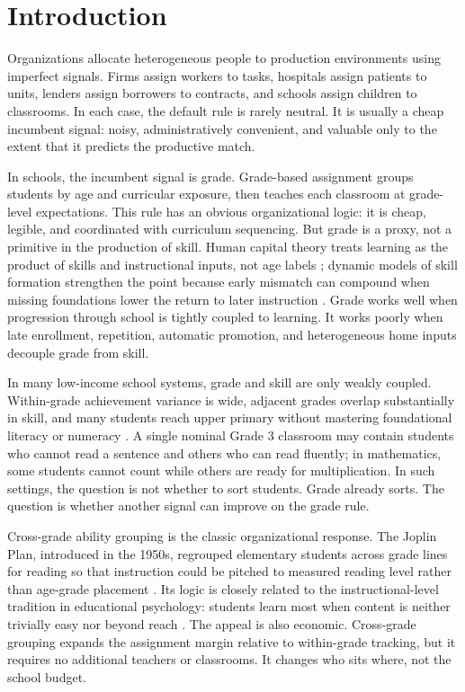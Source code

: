 \documentclass[11pt]{article}
\begin{document}
\section{Introduction}
\label{sec:intro}

Organizations allocate heterogeneous people to production environments using imperfect signals. Firms assign workers to tasks, hospitals assign patients to units, lenders assign borrowers to contracts, and schools assign children to classrooms. In each case, the default rule is rarely neutral. It is usually a cheap incumbent signal: noisy, administratively convenient, and valuable only to the extent that it predicts the productive match.

In schools, the incumbent signal is grade. Grade-based assignment groups students by age and curricular exposure, then teaches each classroom at grade-level expectations. This rule has an obvious organizational logic: it is cheap, legible, and coordinated with curriculum sequencing. But grade is a proxy, not a primitive in the production of skill. Human capital theory treats learning as the product of skills and instructional inputs, not age labels \citep{benporath1967}; dynamic models of skill formation strengthen the point because early mismatch can compound when missing foundations lower the return to later instruction \citep{cunhaheckman2007}. Grade works well when progression through school is tightly coupled to learning. It works poorly when late enrollment, repetition, automatic promotion, and heterogeneous home inputs decouple grade from skill.

In many low-income school systems, grade and skill are only weakly coupled. Within-grade achievement variance is wide, adjacent grades overlap substantially in skill, and many students reach upper primary without mastering foundational literacy or numeracy \citep{banerjee/cole/duflo/linden:2007,muralidharan2019disrupting}. A single nominal Grade 3 classroom may contain students who cannot read a sentence and others who can read fluently; in mathematics, some students cannot count while others are ready for multiplication. In such settings, the question is not whether to sort students. Grade already sorts. The question is whether another signal can improve on the grade rule.

Cross-grade ability grouping is the classic organizational response. The Joplin Plan, introduced in the 1950s, regrouped elementary students across grade lines for reading so that instruction could be pitched to measured reading level rather than age-grade placement \citep{floyd:1954}. Its logic is closely related to the instructional-level tradition in educational psychology: students learn most when content is neither trivially easy nor beyond reach \citep{betts1946,vygotsky1978}. The appeal is also economic. Cross-grade grouping expands the assignment margin relative to within-grade tracking, but it requires no additional teachers or classrooms. It changes who sits where, not the school budget.
\end{document}
